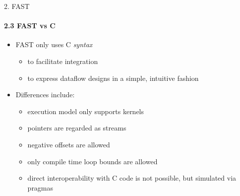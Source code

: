 \begin{frame}{2. FAST}
  \framesubtitle{2.3 FAST vs C}
  \begin{itemize}
  \item FAST only uses C \emph{syntax}
    \begin{itemize}
      \setlength{\itemsep}{5pt}
    \item to facilitate integration
    \item to express dataflow designs in a simple, intuitive fashion
    \end{itemize}
    \vspace{0.5cm}
  \item  Differences include:
    \begin{itemize}
      \setlength{\itemsep}{5pt}
    \item execution model only supports kernels
    \item pointers are regarded as   streams
    \item negative offsets are allowed
    \item only compile time loop bounds are allowed
    \item direct interoperability with C code is not possible, but
      simulated via pragmas
    \end{itemize}
  \end{itemize}

\end{frame}